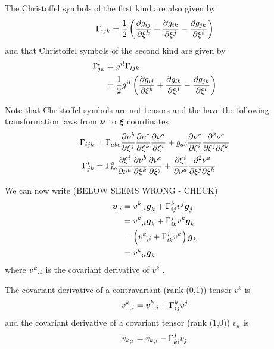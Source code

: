 The Christoffel symbols of the first kind are also given by
\begin{equation}
   \Gamma_{ijk} =\frac{1}{2}\left(  \dfrac{\partial g_{ij}}{\partial \xi^{k}} + \dfrac{\partial g_{ik}}{\partial \xi^{j}} - \dfrac{\partial g_{jk}}{\partial \xi^{i}}  \right)
\end{equation}
and that Christoffel symbols of the second kind are given by
\begin{equation}
  \begin{split}
     \Gamma^{i}_{jk}  &= g^{il} \Gamma_{ljk}  \\
    &= \frac{1}{2}g^{il}\left(  \dfrac{\partial g_{lj}}{\partial \xi^{k}} + \dfrac{\partial g_{lk}}{\partial \xi^{j}} - \dfrac{\partial g_{jk}}{\partial \xi^{l}}  \right) 
  \end{split}
\end{equation}

Note that Christoffel symbols are not tensors and the have the following
transformation laws from $ \boldsymbol{\nu} $ to $ \boldsymbol{\xi} $ coordinates
\begin{align}
   \Gamma_{ijk}  &=
   \Gamma_{abc}  \dfrac{\partial \nu^{b}}{\partial \xi^{j}}  \dfrac{\partial \nu^{c}}{\partial \xi^{k}}  \dfrac{\partial \nu^{a}}{\partial \xi^{i}} +
  g_{ab} \dfrac{\partial \nu^{c}}{\partial \xi^{i}}  \dfrac{\partial^{2} \nu^{c}}{\partial \xi^{j} \partial \xi^{k}}  \\
   \Gamma^{i}_{jk}  &=  \Gamma^{a}_{bc}  \dfrac{\partial \xi^{i}}{\partial \nu^{a}}  \dfrac{\partial \nu^{b}}{\partial \xi^{k}}  \dfrac{\partial \nu^{c}}{\partial \xi^{j}} +
   \dfrac{\partial \xi^{i}}{\partial \nu^{a}}  \dfrac{\partial^{2} \nu^{a}}{\partial \xi^{j} \partial \xi^{k}}  \\
\end{align}

We can now write (BELOW SEEMS WRONG - CHECK)
\begin{equation}
  \begin{split}
     {\ensuremath{ \boldsymbol{v} }}_{,i} &= {v^{k}}_{,i}  \boldsymbol{g} _{k}+ \Gamma^{k}_{ij} v^{j} \boldsymbol{g} _{j}\\
    &= {v^{k}}_{,i}  \boldsymbol{g} _{k}+ \Gamma^{j}_{ik} v^{k} \boldsymbol{g} _{k}\\
    &=\left(  {v^{k}}_{,i} + \Gamma^{j}_{ik} v^{k} \right) \boldsymbol{g} _{k}\\
    &= {v^{k}}_{;i}  \boldsymbol{g} _{k}
  \end{split}
\end{equation}
where $ {v^{k}}_{;i} $ is the covariant derivative of $v^{k}$ . 

The covariant derivative of a contravariant (rank (0,1)) tensor $v^{k}$ is
\begin{equation}
   {v^{k}}_{;i}  = {v^{k}}_{,i} + \Gamma^{k}_{ij} v^{j}
\end{equation}
and the covariant derivative of a covariant tensor  (rank (1,0)) $v_{k}$ is
\begin{equation}
   {v_{k}}_{;i}  = {v_{k}}_{,i} - \Gamma^{j}_{ki} v_{j}
\end{equation}

